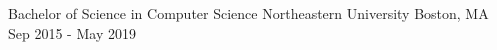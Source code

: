 
\begin{cventries}
  \cventry
    {Bachelor of Science in Computer Science} %
    {Northeastern University} %
    {Boston, MA} %
    {Sep 2015 - May 2019} %
    {
    }
\end{cventries}
